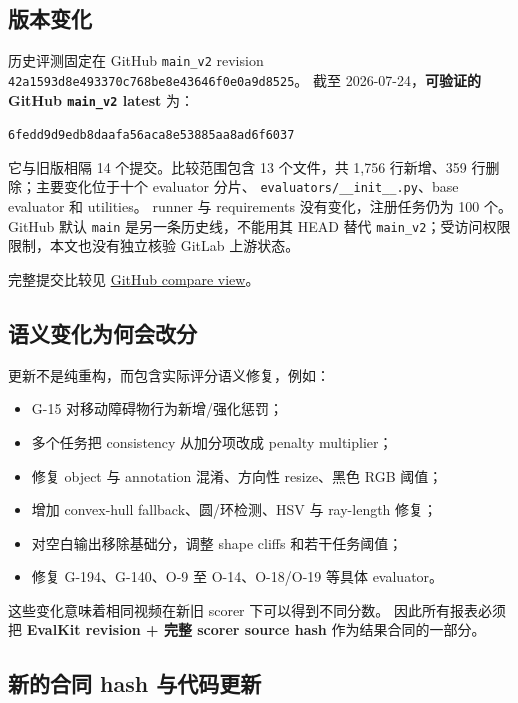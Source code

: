 \documentclass[11pt,a4paper]{article}
\newcommand{\code}[1]{\texttt{#1}}
\begin{document}
\subsection{版本变化}

历史评测固定在 GitHub \code{main\_v2} revision
\code{42a1593d8e493370c768be8e43646f0e0a9d8525}。
截至 2026-07-24，\textbf{可验证的 GitHub \code{main\_v2} latest}
\cite{evalkit} 为：
\begin{center}
  \small\code{6fedd9d9edb8daafa56aca8e53885aa8ad6f6037}
\end{center}
它与旧版相隔 14 个提交。比较范围包含 13 个文件，共
1,756 行新增、359 行删除；主要变化位于十个 evaluator 分片、
\code{evaluators/\_\_init\_\_.py}、base evaluator 和 utilities。
runner 与 requirements 没有变化，注册任务仍为 100 个。
GitHub 默认 \code{main} 是另一条历史线，不能用其 HEAD 替代
\code{main\_v2}；受访问权限限制，本文也没有独立核验 GitLab 上游状态。

完整提交比较见
\href{https://github.com/xujunxiangwork/VBVR-Evalkit-Interleave/compare/42a1593d8e493370c768be8e43646f0e0a9d8525...6fedd9d9edb8daafa56aca8e53885aa8ad6f6037}
{GitHub compare view}。

\subsection{语义变化为何会改分}

更新不是纯重构，而包含实际评分语义修复，例如：

\begin{itemize}
  \item G-15 对移动障碍物行为新增/强化惩罚；
  \item 多个任务把 consistency 从加分项改成 penalty multiplier；
  \item 修复 object 与 annotation 混淆、方向性 resize、黑色 RGB 阈值；
  \item 增加 convex-hull fallback、圆/环检测、HSV 与 ray-length 修复；
  \item 对空白输出移除基础分，调整 shape cliffs 和若干任务阈值；
  \item 修复 G-194、G-140、O-9 至 O-14、O-18/O-19 等具体 evaluator。
\end{itemize}

这些变化意味着相同视频在新旧 scorer 下可以得到不同分数。
因此所有报表必须把 \textbf{EvalKit revision + 完整 scorer source hash}
作为结果合同的一部分。

\subsection{新的合同 hash 与代码更新}
\end{document}
